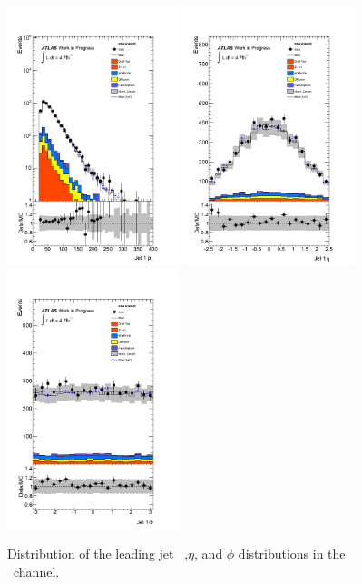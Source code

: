 \begin{figure}[htbp!]
     \begin{center}
     \includegraphics[width=50mm]{f/emu_jet2_pt_central_double}
     \includegraphics[width=50mm]{f/emu_jet2_eta_central_double}
     \includegraphics[width=50mm]{f/emu_jet2_phi_central_double}
     \end{center}
     \caption{Distribution of the leading jet \pt\ ,$\eta$, and $\phi$ distributions in the \emu\ channel.}
     \label{fig:dilep_jet2_emu}
    \end{figure}

